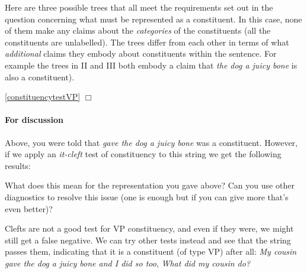 \documentclass{article}
\begin{document}
\begin{answer}
{
Here are three possible trees that all meet the requirements set out in the question concerning what must be represented as a constituent. In this case, none of them make any claims about the \emph{categories} of the constituents (all the constituents are unlabelled). The trees differ from each other in terms of what \emph{additional} claims they embody about constituents within the sentence.  For example the trees in II and III both embody a claim that \emph{the dog a juicy bone} is also a constituent).\\
\begin{quote}
\end{quote}
}
\end{answer}

\hfill{}\ref{constituencytestVP} $\Box$

\paragraph{For discussion} Above, you were told that \emph{gave the dog a juicy bone} was a constituent.
However, if we apply an \emph{it-cleft} test of constituency to this string we get the following results:
\begin{exe}
\end{exe}
What does this mean for the representation you gave above?
Can you use other diagnostics to resolve this issue (one is enough but if you can give more that's even better)?

\begin{answer}
{
Clefts are not a good test for VP constituency, and even if they were, we might still get a false negative. We can try other tests instead and see that the string passes them, indicating that it is a constituent (of type VP) after all: \emph{My cousin gave the dog a juicy bone and I did so too}, \emph{What did my cousin do?}
}
\end{answer}
\end{document}
